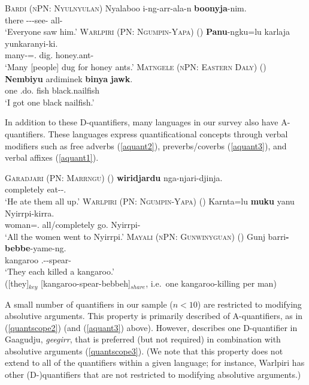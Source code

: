 \documentclass[12pt,egregdoesnotlikesansseriftitles]{scrartcl}
\begin{document}
\begin{exe}
  \ex\label{allerg} \textsc{Bardi (nPN: Nyulnyulan)}\hfill {}
  \gll Nyalaboo i-ng-arr-ala-n \textbf{boonyja}-nim.\\
  there \Third-\Pst-\Aug-see-\Rempst{} all-\Erg\\
  \glt `Everyone saw him.'
  \ex \textsc{Warlpiri (PN: Ngumpin-Yapa)} \hfill(\citealt[6]{bowler17})
  \gll \textbf{Panu}-ngku=lu karlaja yunkaranyi-ki.\\
  many-\Erg=\Tpl.\Sarg{} dig.\Pst{} honey.ant-\Dat\\
  \glt `Many [people] dug for honey ants.' \label{agrmarking1}
  \ex \textsc{Matngele (nPN: Eastern Daly)} \hfill(\citealt[54]{zandvoort99})
  \gll \textbf{Nembiyu} ardiminek \textbf{binya} \textbf{jawk}.\\
  one \First\Min\Sarg.do.\Pst{} fish black.nailfish\\
  \glt `I got one black nailfish.'  \label{discconst}
\end{exe}


In addition to these D-quantifiers, many languages in our survey also have A-quantifiers. These languages express quantificational concepts through verbal modifiers such as free adverbs (\ref{aquant2}), preverbs/coverbs (\ref{aquant3}), and verbal affixes (\ref{aquant1}).
\begin{exe}
  \ex\textsc{Garadjari (PN: Marrngu)} \hfill(\citealt[54]{sands89})
  \gll \textbf{wiridjardu}  nga-njari-djinja.\\
  completely  eat-\Cont{}-\Tpl.\Parg\\
  \glt `He ate them all up.' \label{aquant2}
  \ex \textsc{Warlpiri (PN: Ngumpin-Yapa)} \hfill (\citealt[15]{bowler17})
  \gll Karnta=lu \textbf{muku} yanu Nyirrpi-kirra.\\
  woman=\Tpl.\Sarg{} all/completely go.\Pst{} Nyirrpi-\All\\
  `All the women went to Nyirrpi.' \label{aquant3}
  \ex \textsc{Mayali (nPN: Gunwinyguan)} \hfill(\citealt[221]{evans95})
  \gll Gunj barri\textbf{-bebbe}-yame-ng.\\
  kangaroo \Third.\Aug-\Distr-spear-\Pp\\
  \glt `They each killed a kangaroo.'\\
  ([they]$_{key}$ [kangaroo-spear-bebbeh]$_{share}$, i.e.\ one kangaroo-killing per man) \label{aquant1}
\end{exe}

A small number of quantifiers in our sample ($ n < 10$) are restricted to modifying absolutive arguments. This property is primarily described of A-quantifiers, as in (\ref{quantscope2}) (and (\ref{aquant3}) above). However, \cite{harvey92} describes one D-quantifier in Gaagudju, \textit{geegirr}, that is preferred (but not required) in combination with absolutive arguments (\ref{quantscope3}). (We note that this property does not extend to all of the quantifiers within a given language; for instance, Warlpiri has other (D-)quantifiers that are not restricted to modifying absolutive arguments.)
\end{document}
